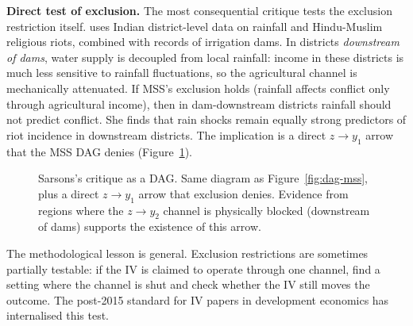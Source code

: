 \documentclass[11pt,a4paper]{article}
\begin{document}
\textbf{Direct test of exclusion.} The most consequential critique
tests the exclusion restriction itself. \citet{Sarsons2015} uses
Indian district-level data on rainfall and Hindu-Muslim religious
riots, combined with records of irrigation dams. In districts
\emph{downstream of dams}, water supply is decoupled from local
rainfall: income in these districts is much less sensitive to rainfall
fluctuations, so the agricultural channel is mechanically attenuated.
If MSS's exclusion holds (rainfall affects conflict only through
agricultural income), then in dam-downstream districts rainfall should
not predict conflict. She finds that rain shocks remain equally strong
predictors of riot incidence in downstream districts. The implication is a
direct $z \to y_1$ arrow that the MSS DAG denies (Figure~\ref{fig:dag-sarsons}).

\begin{figure}[H]
\centering
{}
\caption{Sarsons's critique as a DAG. Same diagram as
Figure~\ref{fig:dag-mss}, plus a direct $z \to y_1$ arrow that exclusion
denies. Evidence from regions where the $z \to y_2$ channel is
physically blocked (downstream of dams) supports the existence of this
arrow.}
\label{fig:dag-sarsons}
\end{figure}

The methodological lesson is general. Exclusion restrictions are
sometimes partially testable: if the IV is claimed to operate through
one channel, find a setting where the channel is shut and check whether
the IV still moves the outcome. The post-2015 standard for IV papers in
development economics has internalised this test.

\end{document}
